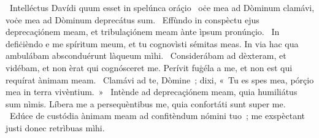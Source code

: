{~Intelléctus Davídi quum esset in spelúnca oráçio}
{%
~oċe mea ad Dòminum clamávi, voċe mea ad Dòminum deprecátus sum.
~Effùndo in conspèctu ejus deprecaçiónem meam, et tribulaçiónem meam ànte ìpsum pronúnçio.
~In defiċièndo e me spíritum meum, et tu cognovìsti sémitas meas. In via hac qua ambulábam absconduérunt làqueum mìhi.
~Considerábam ad dèxteram, et vidébam, et non èrat qui cognósceret me. Perívit fuġéla a me, et non est qui requírat ànimam meam.
~Clamávi ad te, Dòmine~; dixi, «~Tu es spes mea, pórçio mea in terra vivèntium.~»
~Intènde ad deprecaçiónem meam, quia humiliátus sum nìmis. Líbera me a persequèntibus me, quia confortáti sunt super me.
~Edúce de custódia ànimam meam ad confitèndum nómini tuo~; me exspèctant justi donec retrìbuas mìhi.}
